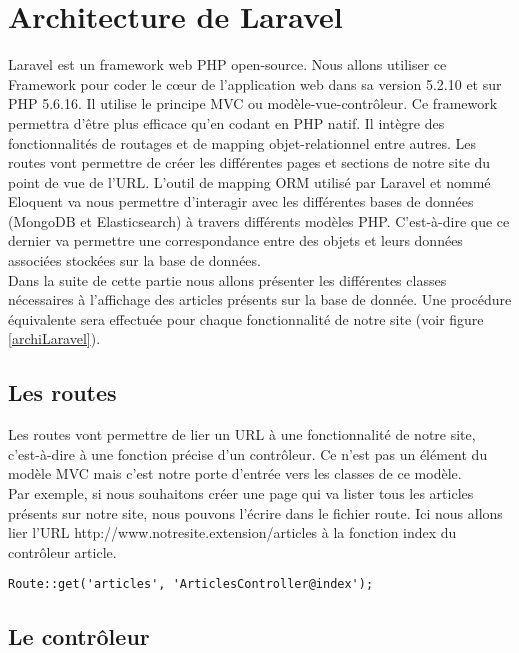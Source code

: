 \newpage
\section{Architecture de Laravel}
\label{sec:laravel}

Laravel\cite{Laravel} est un framework web PHP open-source. Nous allons utiliser ce Framework pour coder le cœur de l'application web dans sa version 5.2.10 et sur PHP 5.6.16. Il utilise le principe MVC ou modèle-vue-contrôleur. Ce framework permettra d'être plus efficace qu'en codant en PHP natif. Il intègre des fonctionnalités de routages et de mapping objet-relationnel entre autres. Les routes vont permettre de créer les différentes pages et sections de notre site du point de vue de l'URL. L'outil de mapping ORM utilisé par Laravel et nommé Eloquent va nous permettre d'interagir avec les différentes bases de données (MongoDB et Elasticsearch) à travers différents modèles PHP. C'est-à-dire que ce dernier va permettre une correspondance entre des objets et leurs données associées stockées sur la base de données.\\
Dans la suite de cette partie nous allons présenter les différentes classes nécessaires à l'affichage des articles présents sur la base de donnée. Une procédure équivalente sera effectuée pour chaque fonctionnalité de notre site (voir figure \ref{archiLaravel}).

\subsection{Les routes}

Les routes vont permettre de lier un URL à une fonctionnalité de notre site, c'est-à-dire à une fonction précise d'un contrôleur. Ce n'est pas un élément du modèle MVC mais c'est notre porte d'entrée vers les classes de ce modèle.\\
Par exemple, si nous souhaitons créer une page qui va lister tous les articles présents sur notre site, nous pouvons l'écrire dans le fichier route. Ici nous allons lier l'URL http://www.notresite.extension/articles à la fonction index du contrôleur article.

\begin{verbatim}
Route::get('articles', 'ArticlesController@index');
\end{verbatim}

\subsection{Le contrôleur}

